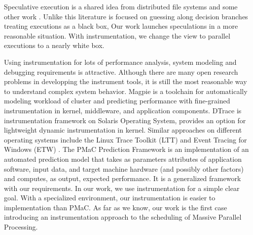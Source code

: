 Speculative execution is a shared idea from distributed file systems \cite{nightingale_speculative_2006} and some other work \cite{su_autobash:_2007} . Unlike this literature is focused on guessing along decision branches treating executions as a black box, Our work launches speculations in a more reasonable situation. With instrumentation, we change the view to parallel executions to a nearly white box.

Using instrumentation for lots of performance analysis, system modeling and debugging requirements is attractive. Although there are many open research problems in developping the instrument tools, it is still the most reasonable way to understand complex system behavior. Magpie \cite{barham_using_2004} is a toolchain for automatically modeling workload of cluster and predicting performance with fine-grained instrumentation in kernel, middleware, and application components. DTrace \cite{cantrill_dynamic_2004} is instrumentation framework on Solaris Operating System, provides an option for lightweight dynamic instrumentation in kernel. Similar approaches on different operating systems include the Linux Trace Toolkit (LTT) \cite{yaghmour_measuring_2000} and Event Tracing for Windows (ETW) \cite{_event_2002}. The PMaC Prediction Framework \cite{_pmac_????} is an implementation of an automated prediction model that takes as parameters attributes of application software, input data, and target machine hardware (and possibly other factors) and computes, as output, expected performance. It is a generalized framework with our requirements. In our work, we use instrumentation for a simple clear goal. With a specialized environment, our instrumentation is easier to implementation than PMaC. As far as we know, our work is the first case introducing an instrumentation approach to the scheduling of Massive Parallel Processing.


